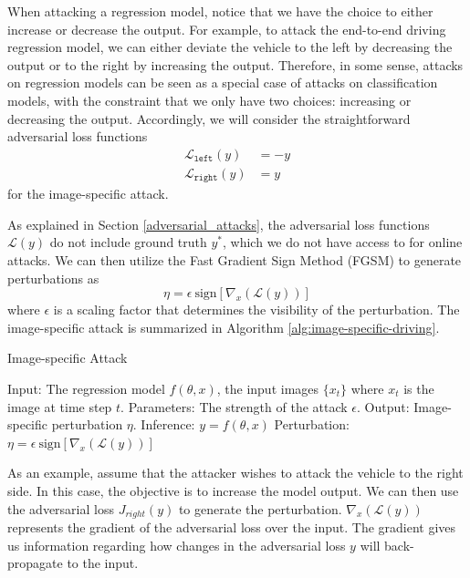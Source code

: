 When attacking a regression model, notice that we have the choice to either increase or decrease the output. For example, to attack the end-to-end driving regression model, we can either deviate the vehicle to the left by decreasing the output or to the right by increasing the output. Therefore, in some sense, attacks on regression models can be seen as a special case of attacks on classification models, with the constraint that we only have two choices: increasing or decreasing the output. Accordingly, we will consider the straightforward adversarial loss functions 
\begin{align}
    \mathcal{L}_{\texttt{left}}(y) &= -y \\
    \mathcal{L}_{\texttt{right}}(y) &= y
\end{align}
for the image-specific attack. 

As explained in Section \ref{adversarial_attacks}, the adversarial loss functions $\mathcal{L}(y)$ do not include ground truth $y^{*}$, which we do not have access to for online attacks. We can then utilize the Fast Gradient Sign Method (FGSM) to generate perturbations as 
\begin{equation}
    \eta = \epsilon \ \text{sign}[\nabla_{x}( \mathcal{L}(y))]
\end{equation}
where $\epsilon$ is a scaling factor that determines the visibility of the perturbation. The image-specific attack is summarized in Algorithm \ref{alg:image-specific-driving}.

\begin{algorithm}[H]
    \caption{Image-specific Attack}\label{alg:image-specific-driving}
    \begin{algorithmic}
        \State Input: The regression model $f(\theta, x)$, the input images $\{x_t\}$ where $x_t$ is the image at time step $t$.
        \State Parameters: The strength of the attack $\epsilon$.
        \State Output: Image-specific perturbation $\eta$.
            \State Inference: $y = f(\theta, x)$
            \State Perturbation: $\eta = \epsilon \ \text{sign}[\nabla_{x}( \mathcal{L}(y))]$
        \EndFor
    \end{algorithmic}
\end{algorithm}

As an example, assume that the attacker wishes to attack the vehicle to the right side. In this case, the objective is to increase the model output. We can then use the adversarial loss $J_{right}(y)$ to generate the perturbation. $\nabla_{x}( \mathcal{L}(y))$ represents the gradient of the adversarial loss over the input. The gradient gives us information regarding how changes in the adversarial loss $y$ will back-propagate to the input.

